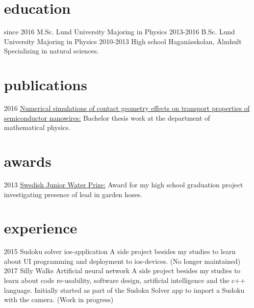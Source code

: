 \documentclass[]{twentysecondcv}
\begin{document}
\section{education}

\begin{twenty}
 \twentyitem
    {since 2016}
    {M.Sc.}
    {Lund University}
    {Majoring in Physics}
  \twentyitem
    {2013-2016}
    {B.Sc.}
    {Lund University}
    {Majoring in Physics}
  \twentyitem
    {2010-2013}
    {High school}
    {Hagan\"asskolan, \"Almhult}
    {Specializing in natural sciences.}
\end{twenty}


\section{publications}

\begin{twentyshort}
  \twentyitemshort
  {2016}
  {\href{http://lup.lub.lu.se/student-papers/record/8878322}{Numerical simulations of contact geometry
    effects on transport properties of semiconductor nanowires:}
  Bachelor thesis work at the department of mathematical physics.}
\end{twentyshort}


\section{awards}

\begin{twentyshort}
  \twentyitemshort
    {2013}
    {\href{http://www.siwi.org/latest/vinner-2013-ars-svenska-confidantes/}{Swedish
      Junior Water Prize:} Award for my high school graduation project
    investigating presence of lead in garden hoses.}
\end{twentyshort}


\section{experience}

\begin{twenty}
  \twentyitem
    {2015}
    {Sudoku solver}
    {ios-application}
    {A side project besides my studies to learn about UI programming
      and deployment to ios-devices. (No longer maintained)}
\twentyitem
    {2017}
    {Silly Walks}
    {Artificial neural network}
    {A side project besides my studies to learn about code
      re-usability, software design, artificial intelligence and
      the c++ language. Initially started as part of the Sudoku Solver
    app to import a Sudoku with the camera. (Work in progress)}
\end{twenty}
\end{document}
